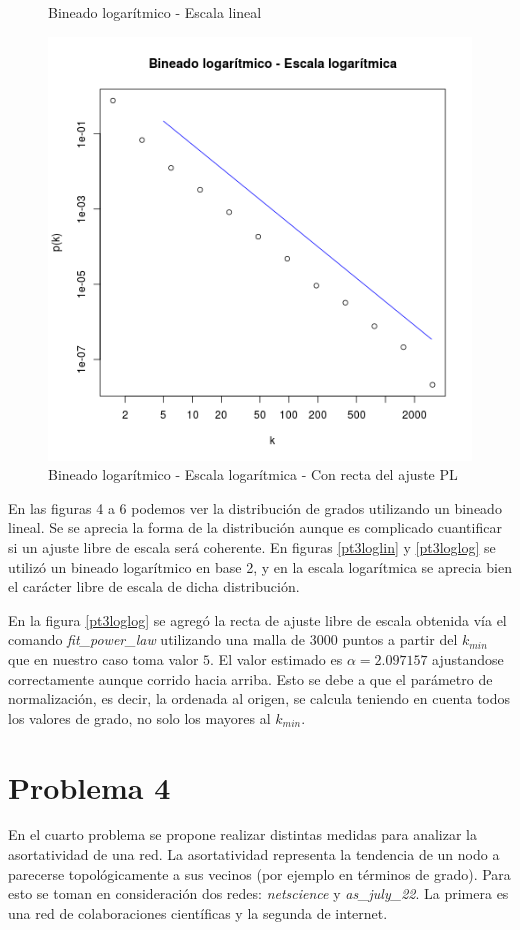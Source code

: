 \documentclass{article}
\begin{document}
\begin{figure}[!htb]
\begin{minipage}{0.3\textwidth}
	\caption{Bineado logarítmico - Escala lineal}
	\label{pt3loglin}
   \end{minipage}\hfill
      \begin{minipage}{0.3\textwidth}
	\centering
	\includegraphics[width=.7\linewidth]{Imagenes_P3/P3_binlog_log.png}
	\caption{Bineado logarítmico - Escala logarítmica - Con recta del ajuste PL}	
	\label{pt3loglog}
   \end{minipage}\hfill
   \label{pt2layout}
\end{figure}

En las figuras 4 a 6 podemos ver la distribución de grados utilizando un bineado lineal. Se se aprecia la forma de la distribución aunque es complicado cuantificar si un ajuste libre de escala será coherente. En figuras \ref{pt3loglin} y \ref{pt3loglog} se utilizó un bineado logarítmico en base 2, y en la escala logarítmica se aprecia bien el carácter libre de escala de dicha distribución.

En la figura \ref{pt3loglog} se agregó la recta de ajuste libre de escala obtenida vía el comando \textit{fit\_power\_law} utilizando una malla de $3000$ puntos a partir del $k_{min}$ que en nuestro caso toma valor $5$. El valor estimado es $\alpha=2.097157$ ajustandose correctamente aunque corrido hacia arriba. Esto se debe a que el parámetro de normalización, es decir, la ordenada al origen, se calcula teniendo en cuenta todos los valores de grado, no solo los mayores al $k_{min}$.

\section{Problema 4}
En el cuarto problema se propone realizar distintas medidas para analizar la asortatividad de una red. La asortatividad representa la tendencia de un nodo a parecerse topológicamente a sus vecinos (por ejemplo en términos de grado). Para esto se toman en consideración dos redes: \textit{netscience} y \textit{as\_july\_22}. La primera es una red de colaboraciones científicas y la segunda de internet.
\end{document}
